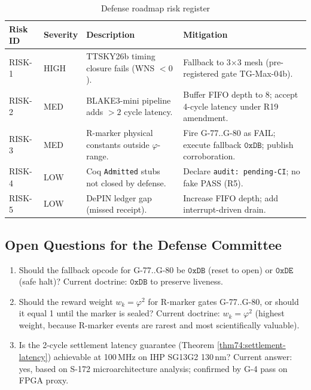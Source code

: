 \begin{table}[H]
\centering
\caption{Defense roadmap risk register}
\label{tab74:risks}
\small
\begin{tabular}{llp{4cm}p{4cm}}
\toprule
Risk ID & Severity & Description & Mitigation \\
\midrule
RISK-1 & HIGH & TTSKY26b timing closure fails (WNS $< 0$). & Fallback to 3$\times$3 mesh (pre-registered gate TG-Max-04b). \\
RISK-2 & MED  & BLAKE3-mini pipeline adds $> 2$ cycle latency. & Buffer FIFO depth to 8; accept 4-cycle latency under R19 amendment. \\
RISK-3 & MED  & R-marker physical constants outside $\varphi$-range. & Fire G-77..G-80 as FAIL; execute fallback $\mathtt{0xDB}$; publish corroboration. \\
RISK-4 & LOW  & Coq \texttt{Admitted} stubs not closed by defense. & Declare \texttt{audit: pending-CI}; no fake PASS (R5). \\
RISK-5 & LOW  & DePIN ledger gap (missed receipt). & Increase FIFO depth; add interrupt-driven drain. \\
\bottomrule
\end{tabular}
\end{table}

\subsection{Open Questions for the Defense Committee}
\label{sec74:open-questions}

\begin{enumerate}
  \item Should the fallback opcode for G-77..G-80 be $\mathtt{0xDB}$
    (reset to open) or $\mathtt{0xDE}$ (safe halt)?  Current doctrine:
    $\mathtt{0xDB}$ to preserve liveness.
  \item Should the reward weight $w_k = \varphi^{2}$ for R-marker gates
    G-77..G-80, or should it equal 1 until the marker is sealed?
    Current doctrine: $w_k = \varphi^{2}$ (highest weight, because
    R-marker events are rarest and most scientifically valuable).
  \item Is the 2-cycle settlement latency guarantee (Theorem
    \ref{thm74:settlement-latency}) achievable at 100\,MHz on
    IHP SG13G2 130\,nm?  Current answer: yes, based on S-172
    microarchitecture analysis; confirmed by G-4 pass on FPGA proxy.
\end{enumerate}

